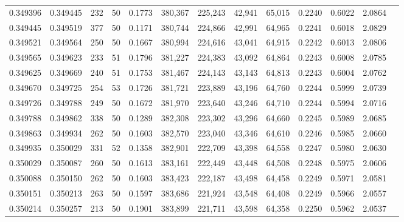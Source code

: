 \begin{tabular}{rrrrrrrrrrrrr}
0.349396 & 0.349445 &   232 &  50 &                                     0.1773 & 380,367 & 225,243 &  42,941 &  65,015 & 0.2240 & 0.6022 & 2.0864 \\
0.349445 & 0.349519 &   377 &  50 &                                     0.1171 & 380,744 & 224,866 &  42,991 &  64,965 & 0.2241 & 0.6018 & 2.0829 \\
0.349521 & 0.349564 &   250 &  50 &                                     0.1667 & 380,994 & 224,616 &  43,041 &  64,915 & 0.2242 & 0.6013 & 2.0806 \\
0.349565 & 0.349623 &   233 &  51 &                                     0.1796 & 381,227 & 224,383 &  43,092 &  64,864 & 0.2243 & 0.6008 & 2.0785 \\
0.349625 & 0.349669 &   240 &  51 &                                     0.1753 & 381,467 & 224,143 &  43,143 &  64,813 & 0.2243 & 0.6004 & 2.0762 \\
0.349670 & 0.349725 &   254 &  53 &                                     0.1726 & 381,721 & 223,889 &  43,196 &  64,760 & 0.2244 & 0.5999 & 2.0739 \\
0.349726 & 0.349788 &   249 &  50 &                                     0.1672 & 381,970 & 223,640 &  43,246 &  64,710 & 0.2244 & 0.5994 & 2.0716 \\
0.349788 & 0.349862 &   338 &  50 &                                     0.1289 & 382,308 & 223,302 &  43,296 &  64,660 & 0.2245 & 0.5989 & 2.0685 \\
0.349863 & 0.349934 &   262 &  50 &                                     0.1603 & 382,570 & 223,040 &  43,346 &  64,610 & 0.2246 & 0.5985 & 2.0660 \\
0.349935 & 0.350029 &   331 &  52 &                                     0.1358 & 382,901 & 222,709 &  43,398 &  64,558 & 0.2247 & 0.5980 & 2.0630 \\
0.350029 & 0.350087 &   260 &  50 &                                     0.1613 & 383,161 & 222,449 &  43,448 &  64,508 & 0.2248 & 0.5975 & 2.0606 \\
0.350088 & 0.350150 &   262 &  50 &                                     0.1603 & 383,423 & 222,187 &  43,498 &  64,458 & 0.2249 & 0.5971 & 2.0581 \\
0.350151 & 0.350213 &   263 &  50 &                                     0.1597 & 383,686 & 221,924 &  43,548 &  64,408 & 0.2249 & 0.5966 & 2.0557 \\
0.350214 & 0.350257 &   213 &  50 &                                     0.1901 & 383,899 & 221,711 &  43,598 &  64,358 & 0.2250 & 0.5962 & 2.0537 \\

\end{tabular}
